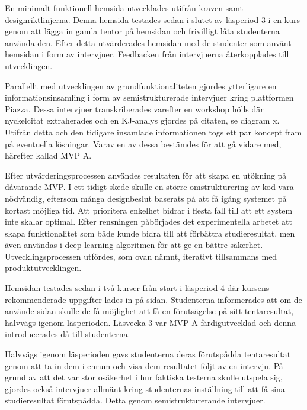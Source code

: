 En minimalt funktionell hemsida utvecklades utifrån kraven samt designriktlinjerna. Denna hemsida testades sedan i slutet av läsperiod 3 i en kurs genom att lägga in gamla tentor på hemsidan och frivilligt låta studenterna använda den. Efter detta utvärderades hemsidan med de studenter som använt hemsidan i form av intervjuer. Feedbacken från intervjuerna återkopplades till utvecklingen. 

Parallellt med utvecklingen av grundfunktionaliteten gjordes ytterligare en informationsinsamling i form av semistrukturerade intervjuer kring plattformen Piazza. Dessa intervjuer transkriberades varefter en workshop hölls där nyckelcitat extraherades och en KJ-analys gjordes på citaten, se diagram x. Utifrån detta och den tidigare insamlade informationen togs ett par koncept fram på eventuella lösningar. Varav en av dessa bestämdes för att gå vidare med, härefter kallad MVP A. 

Efter utvärderingsprocessen användes resultaten för att skapa en utökning på dåvarande MVP. I ett tidigt skede skulle en större omstrukturering av kod vara nödvändig, eftersom många designbeslut baserats på att få igång systemet på kortast möjliga tid. Att prioritera enkelhet bidrar i flesta fall till att ett system inte skalar optimal. Efter rensningen påbörjades det experimentella arbetet att skapa funktionalitet som både kunde bidra till att förbättra studieresultat, men även användas i deep learning-algoritmen för att ge en bättre säkerhet. Utvecklingsprocessen utfördes, som ovan nämnt, iterativt tillsammans med produktutvecklingen. 

Hemsidan testades sedan i två kurser från start i läsperiod 4 där kursens rekommenderade uppgifter lades in på sidan. Studenterna informerades att om de använde sidan skulle de få möjlighet att få en förutsägelse på sitt tentaresultat, halvvägs igenom läsperioden. Läsvecka 3 var MVP A färdigutvecklad och denna introducerades då till studenterna. 



Halvvägs igenom läsperioden gavs studenterna deras förutspådda tentaresultat genom att ta in dem i enrum och visa dem resultatet följt av en intervju. På grund av att det var stor osäkerhet i hur faktiska testerna skulle utspela sig, gjordes också intervjuer allmänt kring studenternas inställning till att få sina studieresultat förutspådda. Detta genom semistrukturerande intervjuer. 



